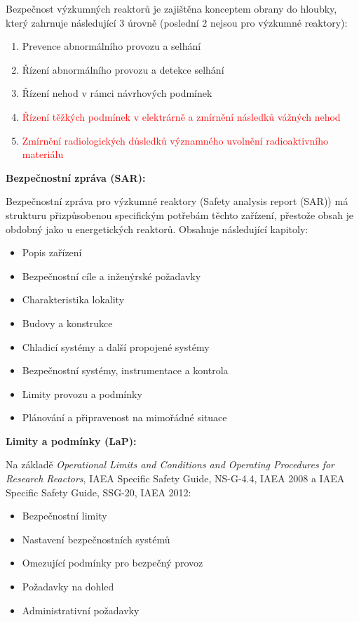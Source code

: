Bezpečnost výzkumných reaktorů je zajištěna konceptem obrany do hloubky, který zahrnuje následující 3 úrovně (poslední 2 nejsou pro výzkumné reaktory):

\begin{enumerate}
    \item Prevence abnormálního provozu a selhání
    \item Řízení abnormálního provozu a detekce selhání
    \item Řízení nehod v rámci návrhových podmínek
    \item \textcolor{red}{Řízení těžkých podmínek v elektrárně a zmírnění následků vážných nehod}
    \item \textcolor{red}{Zmírnění radiologických důsledků významného uvolnění radioaktivního materiálu}
\end{enumerate}

\textbf{Bezpečnostní zpráva (SAR):}

Bezpečnostní zpráva pro výzkumné reaktory (Safety analysis report (SAR)) má strukturu přizpůsobenou specifickým potřebám těchto zařízení, přestože obsah je obdobný jako u energetických reaktorů. Obsahuje následující kapitoly:

\begin{itemize}
    \item Popis zařízení
    \item Bezpečnostní cíle a inženýrské požadavky
    \item Charakteristika lokality
    \item Budovy a konstrukce
    \item Chladicí systémy a další propojené systémy
    \item Bezpečnostní systémy, instrumentace a kontrola
    \item Limity provozu a podmínky
    \item Plánování a připravenost na mimořádné situace
\end{itemize}

\textbf{Limity a podmínky (LaP):}

Na základě \textit{Operational Limits and Conditions and Operating Procedures for Research Reactors}, IAEA Specific Safety Guide, NS-G-4.4, IAEA 2008 a IAEA Specific Safety Guide, SSG-20, IAEA 2012:

\begin{itemize}
    \item Bezpečnostní limity
    \item Nastavení bezpečnostních systémů
    \item Omezující podmínky pro bezpečný provoz
    \item Požadavky na dohled
    \item Administrativní požadavky
\end{itemize}

